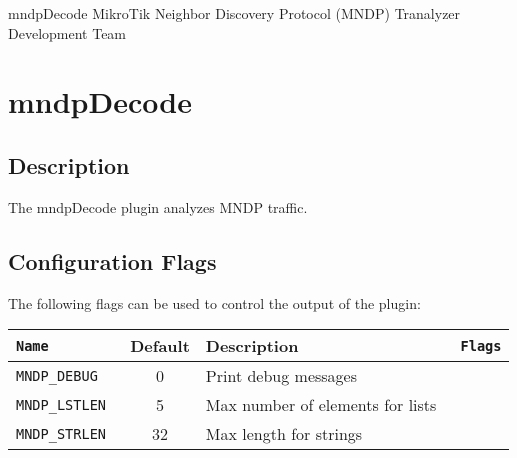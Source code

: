 \documentclass[documentation]{subfiles}
\begin{document}
\trantitle
    {mndpDecode} %
    {MikroTik Neighbor Discovery Protocol (MNDP)} %
    {Tranalyzer Development Team} %

\section{mndpDecode}\label{s:mndpDecode}

\subsection{Description}
The mndpDecode plugin analyzes MNDP traffic.

\subsection{Configuration Flags}
The following flags can be used to control the output of the plugin:
\begin{longtable}{>{\tt}lcl>{\tt\small}l}
    \toprule
    {\bf Name}   & {\bf Default} & {\bf Description}                & {\bf Flags}\\
    \midrule\endhead%
    MNDP\_DEBUG  & 0             & Print debug messages             & \\
    MNDP\_LSTLEN & 5             & Max number of elements for lists & \\
    MNDP\_STRLEN & 32            & Max length for strings           & \\
    \bottomrule
\end{longtable}
\end{document}
